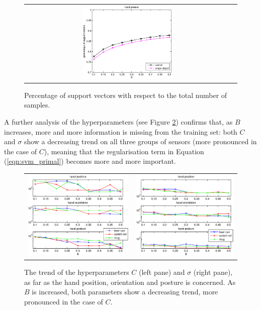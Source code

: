 \begin{figure}[htbp]
\begin{center}
\begin{tabular}{cc}
      \includegraphics[width=0.45\textwidth]{error_cmp_pst_SV.eps} \\
    \end{tabular}
    \caption{Percentage of support vectors with respect to the total
    number of samples.}
    \label{fig:hyperp}
  \end{center}
\end{figure}

A further analysis of the hyperparameters (see Figure
\ref{fig:C_trend}) confirms that, as $B$ increases, more and more
information is missing from the training set: both $C$ and $\sigma$
show a decreasing trend on all three groups of sensors (more
pronounced in the case of $C$), meaning that the regularisation term
in Equation (\ref{eqn:svm_primal}) becomes more and more important.

\begin{figure}[htbp]
  \begin{center}
    \begin{tabular}{cc}
      \includegraphics[width=0.45\linewidth]{trend_C.eps} &
      \includegraphics[width=0.45\linewidth]{trend_sigma.eps}
    \end{tabular}
    \caption{The trend of the hyperparameters $C$ (left pane) and
    $\sigma$ (right pane), as far as the hand position, orientation
    and posture is concerned. As $B$ is increased, both parameters show a
    decreasing trend, more pronounced in the case of $C$.}
    \label{fig:C_trend}
  \end{center}
\end{figure}

